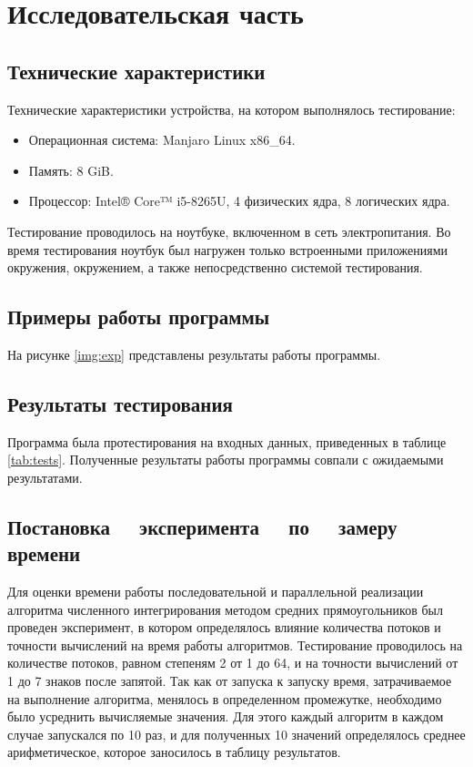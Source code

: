 \chapter{Исследовательская часть}

\section{Технические характеристики}

Технические характеристики устройства, на котором выполнялось тестирование:

\begin{itemize}
	\item Операционная система: Manjaro \cite{manjaro} Linux x86\_64.
	\item Память: 8 GiB.
	\item Процессор: Intel® Core™ i5-8265U, 4 физических ядра, 8 логических ядра\cite{intel}.
\end{itemize}

Тестирование проводилось на ноутбуке, включенном в сеть электропитания. Во
время тестирования ноутбук был нагружен только встроенными приложениями
окружения, окружением, а также непосредственно системой тестирования.

\section{Примеры работы программы}

На рисунке \ref{img:exp} представлены результаты работы программы.


\section{Результаты тестирования}

Программа была протестирования на входных данных, приведенных в таблице
\ref{tab:tests}. Полученные результаты работы программы совпали с ожидаемыми
результатами.

\section[Постановка эксперимента по замеру времени]
        {Постановка ~~эксперимента ~~по ~~замеру времени}

Для оценки времени работы последовательной и параллельной реализации алгоритма
численного интегрирования методом средних прямоугольников был проведен
эксперимент, в котором определялось влияние количества потоков и точности
вычислений на время работы алгоритмов. Тестирование проводилось на количестве
потоков, равном степеням 2 от 1 до 64, и на точности вычислений от 1 до 7
знаков после запятой. Так как от запуска к запуску время, затрачиваемое на
выполнение алгоритма, менялось в определенном промежутке, необходимо было
усреднить вычисляемые значения. Для этого каждый алгоритм в каждом случае
запускался по 10 раз, и для полученных 10 значений определялось среднее
арифметическое, которое заносилось в таблицу результатов.

